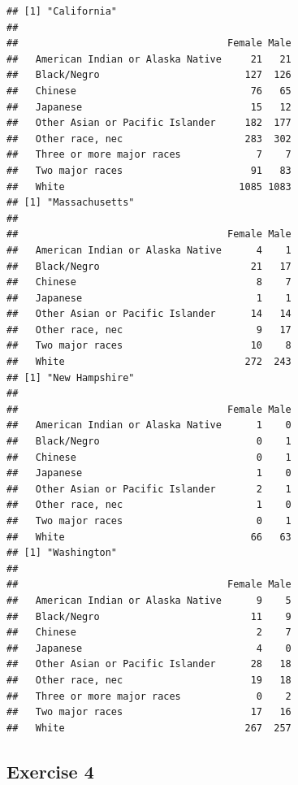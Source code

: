 \documentclass[]{book}
\theoremstyle{definition}
\theoremstyle{definition}
\theoremstyle{definition}
\theoremstyle{remark}
\begin{document}
\begin{verbatim}
## [1] "California"
##                                   
##                                    Female Male
##   American Indian or Alaska Native     21   21
##   Black/Negro                         127  126
##   Chinese                              76   65
##   Japanese                             15   12
##   Other Asian or Pacific Islander     182  177
##   Other race, nec                     283  302
##   Three or more major races             7    7
##   Two major races                      91   83
##   White                              1085 1083
## [1] "Massachusetts"
##                                   
##                                    Female Male
##   American Indian or Alaska Native      4    1
##   Black/Negro                          21   17
##   Chinese                               8    7
##   Japanese                              1    1
##   Other Asian or Pacific Islander      14   14
##   Other race, nec                       9   17
##   Two major races                      10    8
##   White                               272  243
## [1] "New Hampshire"
##                                   
##                                    Female Male
##   American Indian or Alaska Native      1    0
##   Black/Negro                           0    1
##   Chinese                               0    1
##   Japanese                              1    0
##   Other Asian or Pacific Islander       2    1
##   Other race, nec                       1    0
##   Two major races                       0    1
##   White                                66   63
## [1] "Washington"
##                                   
##                                    Female Male
##   American Indian or Alaska Native      9    5
##   Black/Negro                          11    9
##   Chinese                               2    7
##   Japanese                              4    0
##   Other Asian or Pacific Islander      28   18
##   Other race, nec                      19   18
##   Three or more major races             0    2
##   Two major races                      17   16
##   White                               267  257
\end{verbatim}

\hypertarget{exercise-4}{%
\subsection*{Exercise 4}\label{exercise-4}}
\end{document}
